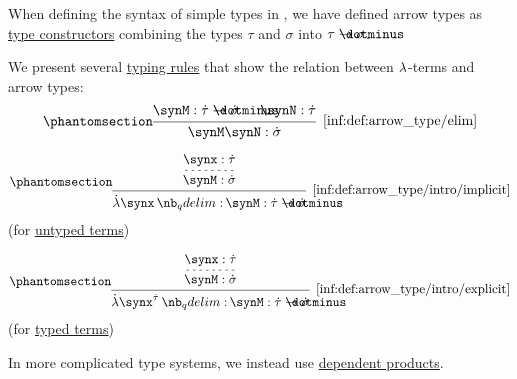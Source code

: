 \begin{definition}\label{def:arrow_type}
  When defining the syntax of simple types in , we have defined arrow types as \hyperref[con:type_constructor]{type constructors} combining the types \( \tau \) and \( \sigma \) into \( \tau \synimplies \sigma \).

  We present several \hyperref[def:type_derivation_tree]{typing rules} that show the relation between \( {\mathrm \lambda} \)-terms and arrow types:
  \begin{equation*}\taglabel[\ensuremath{ \rightarrow_- }]{inf:def:arrow_type/elim}
    \begin{prooftree}
      \hypo{ \synM: \syn\tau \synimplies \syn\sigma }
      \hypo{ \synN: \syn\tau }
      \infer2[\ref{inf:def:arrow_type/elim}]{ \synM \synN: \syn\sigma }
    \end{prooftree}
  \end{equation*}

  \begin{paracol}{2}
    \begin{leftcolumn}
      \centering
      \ParacolAlignmentHack
      \begin{equation*}\taglabel[\ensuremath{ \rightarrow_+^{\logic{ut}} }]{inf:def:arrow_type/intro/implicit}
        \begin{prooftree}
          \hypo{ \synx: \syn\tau }
          \infer[dashed]1{ \synM: \syn\sigma }
          \infer1[\ref{inf:def:arrow_type/intro/implicit}]{ \qabs \synx \synM: \syn\tau \synimplies \syn\sigma }
        \end{prooftree}
      \end{equation*}
      (for \hyperref[def:lambda_term]{untyped terms})
    \end{leftcolumn}

    \begin{rightcolumn}
      \centering
      \ParacolAlignmentHack
      \begin{equation*}\taglabel[\ensuremath{ \rightarrow_+^{\logic{tt}} }]{inf:def:arrow_type/intro/explicit}
        \begin{prooftree}
          \hypo{ \synx: \syn\tau }
          \infer[dashed]1{ \synM: \syn\sigma }
          \infer1[\ref{inf:def:arrow_type/intro/explicit}]{ \qabs {\synx^{\syn\tau}} \synM: \syn\tau \synimplies \syn\sigma }
        \end{prooftree}
      \end{equation*}
      (for \hyperref[def:typed_lambda_term]{typed terms})
    \end{rightcolumn}
  \end{paracol}
\end{definition}
\begin{comments}
  \item In more complicated type systems, we instead use \hyperref[def:dependent_product]{dependent products}.
\end{comments}

